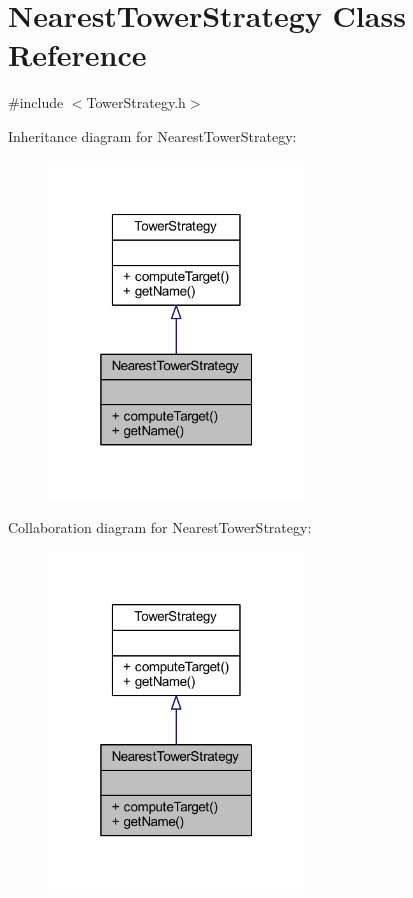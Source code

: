 \hypertarget{class_nearest_tower_strategy}{\section{Nearest\+Tower\+Strategy Class Reference}
\label{class_nearest_tower_strategy}
}


{\ttfamily \#include $<$Tower\+Strategy.\+h$>$}



Inheritance diagram for Nearest\+Tower\+Strategy\+:
\nopagebreak
\begin{figure}[H]
\begin{center}
\leavevmode
\includegraphics[width=193pt]{class_nearest_tower_strategy__inherit__graph}
\end{center}
\end{figure}


Collaboration diagram for Nearest\+Tower\+Strategy\+:
\nopagebreak
\begin{figure}[H]
\begin{center}
\leavevmode
\includegraphics[width=193pt]{class_nearest_tower_strategy__coll__graph}
\end{center}
\end{figure}

